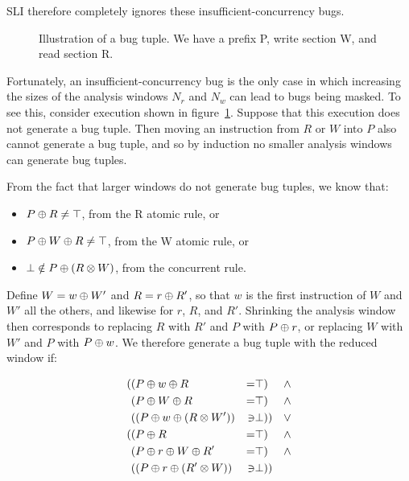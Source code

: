 SLI therefore completely ignores these insufficient-concurrency bugs.


\begin{figure}
Illustration of a bug tuple.  We have a prefix P, write section W, and read section R.
\label{fig:mandatory_concurrency3}
\end{figure}

Fortunately, an insufficient-concurrency bug is the only case in which increasing the sizes of the analysis windows $N_r$ and $N_w$ can lead to bugs being masked.
To see this, consider execution shown in figure~\ref{fig:mandatory_concurrency3}.
Suppose that this execution does not generate a bug tuple.
Then moving an instruction from $R$ or $W$ into $P$ also cannot generate a bug tuple, and so by induction no smaller analysis windows can generate bug tuples.

From the fact that larger windows do not generate bug tuples, we know that:

\begin{itemize}
\item $P \oplus R \not= \top$, from the R atomic rule, or
\item $P \oplus W \oplus R \not= \top$, from the W atomic rule, or
\item $\bot \notin P \oplus (R \otimes W)$, from the concurrent rule.
\end{itemize}

Define $W = w \oplus W'$ and $R = r \oplus R'$, so that $w$ is the first instruction of $W$ and $W'$ all the others, and likewise for $r$, $R$, and $R'$.
Shrinking the analysis window then corresponds to replacing $R$ with $R'$ and $P$ with $P \oplus r$, or replacing $W$ with $W'$ and $P$ with $P \oplus w$.
We therefore generate a bug tuple with the reduced window if:

\begin{align*}
( & (P \oplus w \oplus R & = & \top) & \wedge \\
  & (P \oplus W \oplus R & = & \top) & \wedge \\
  & ((P \oplus w \oplus (R \otimes W')) & \ni & \bot)) & \vee \\
( & (P \oplus R & = & \top) & \wedge \\
  & (P \oplus r \oplus W \oplus R' & = & \top) & \wedge \\
  & ((P \oplus r \oplus (R' \otimes W)) & \ni & \bot))
\end{align*}

